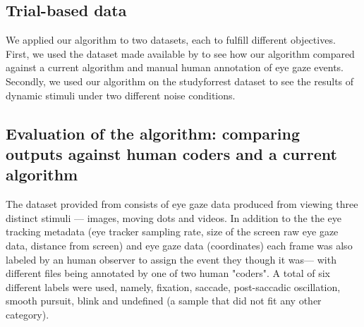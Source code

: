 \documentclass[10pt,a4paper]{extarticle}
\begin{document}

\subsection*{Trial-based data}



We applied our algorithm to two datasets, each to fulfill different objectives. First, we used the dataset made available by \citet{Andersson2017} to see how our algorithm compared against a current algorithm and manual human annotation of eye gaze events. Secondly, we used our algorithm on the studyforrest dataset \cite{Hanke2016} to see the results of dynamic stimuli under two different noise conditions.

\subsection*{Evaluation of the algorithm: comparing outputs against human coders and a current algorithm}

The dataset provided from \citet{Andersson2017} consists of eye gaze data produced from viewing three distinct stimuli --- images, moving dots and videos. In addition to the the eye tracking metadata (eye tracker sampling rate, size of the screen raw eye gaze data, distance from screen) and eye gaze data (coordinates) each frame was also labeled by an human observer to assign the event they though it was--- with different files being annotated by one of two human "coders". A total of six different labels were used, namely, fixation, saccade, post-saccadic oscillation, smooth pursuit, blink and undefined (a sample that did not fit any other category). \\
\end{document}
